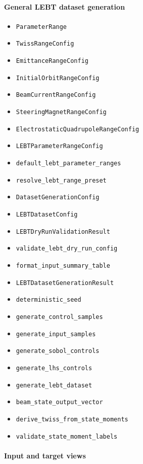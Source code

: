 \documentclass[
]{article}
\providecommand{\tightlist}{%
  \setlength{\itemsep}{0pt}\setlength{\parskip}{0pt}}
\begin{document}
\hypertarget{general-lebt-dataset-generation}{%
\paragraph{General LEBT dataset
generation}\label{general-lebt-dataset-generation}}

\begin{itemize}
\tightlist
\item
  \texttt{ParameterRange}
\item
  \texttt{TwissRangeConfig}
\item
  \texttt{EmittanceRangeConfig}
\item
  \texttt{InitialOrbitRangeConfig}
\item
  \texttt{BeamCurrentRangeConfig}
\item
  \texttt{SteeringMagnetRangeConfig}
\item
  \texttt{ElectrostaticQuadrupoleRangeConfig}
\item
  \texttt{LEBTParameterRangeConfig}
\item
  \texttt{default\_lebt\_parameter\_ranges}
\item
  \texttt{resolve\_lebt\_range\_preset}
\item
  \texttt{DatasetGenerationConfig}
\item
  \texttt{LEBTDatasetConfig}
\item
  \texttt{LEBTDryRunValidationResult}
\item
  \texttt{validate\_lebt\_dry\_run\_config}
\item
  \texttt{format\_input\_summary\_table}
\item
  \texttt{LEBTDatasetGenerationResult}
\item
  \texttt{deterministic\_seed}
\item
  \texttt{generate\_control\_samples}
\item
  \texttt{generate\_input\_samples}
\item
  \texttt{generate\_sobol\_controls}
\item
  \texttt{generate\_lhs\_controls}
\item
  \texttt{generate\_lebt\_dataset}
\item
  \texttt{beam\_state\_output\_vector}
\item
  \texttt{derive\_twiss\_from\_state\_moments}
\item
  \texttt{validate\_state\_moment\_labels}
\end{itemize}

\hypertarget{input-and-target-views}{%
\paragraph{Input and target views}\label{input-and-target-views}}
\end{document}
